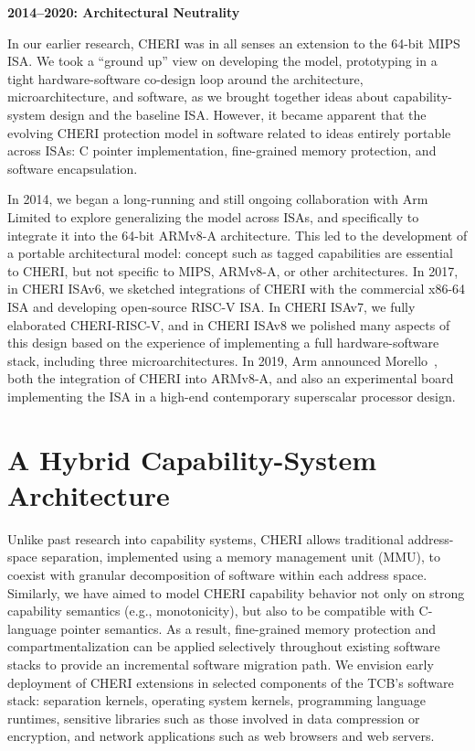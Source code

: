 \medskip
\noindent
\textbf{2014--2020: Architectural Neutrality}

In our earlier research, CHERI was in all senses an extension to the 64-bit
MIPS ISA.
We took a ``ground up'' view on developing the model, prototyping in a tight
hardware-software co-design loop around the architecture, microarchitecture,
and software, as we brought together ideas about capability-system design and
the baseline ISA.
However, it became apparent that the evolving CHERI protection model in
software related to ideas entirely portable across ISAs: C pointer
implementation, fine-grained memory protection, and software encapsulation.

In 2014, we began a long-running and still ongoing collaboration with Arm
Limited to explore generalizing the model across ISAs, and specifically to
integrate it into the 64-bit ARMv8-A architecture.
This led to the development of a portable architectural model: concept such as
tagged capabilities are essential to CHERI, but not specific to MIPS, ARMv8-A,
or other architectures.
In 2017, in CHERI ISAv6, we sketched integrations of CHERI with the commercial
x86-64 ISA and developing open-source RISC-V ISA.
In CHERI ISAv7, we fully elaborated CHERI-RISC-V, and in CHERI ISAv8 we
polished many aspects of this design based on the experience of implementing a
full hardware-software stack, including three microarchitectures.
In 2019, Arm announced Morello~\cite{arm-morello}, both the integration of
CHERI into ARMv8-A, and also an experimental board implementing the ISA in a
high-end contemporary superscalar processor design.

\section{A Hybrid Capability-System Architecture}

Unlike past research into capability systems, CHERI allows traditional address-space separation, implemented using a memory management unit (MMU), to
coexist with granular decomposition of software within each address space.
Similarly, we have aimed to model CHERI capability behavior not only on strong
capability semantics (e.g., monotonicity), but also to be compatible with
C-language pointer semantics.
As a result, fine-grained memory protection and compartmentalization can be applied selectively throughout existing software
stacks to provide an incremental software migration path.
We envision early deployment of CHERI extensions in selected components of the
TCB's software stack: separation kernels, operating system kernels, programming
language runtimes, sensitive libraries such as those involved in data compression or encryption, and network applications such as web browsers and web
servers.

